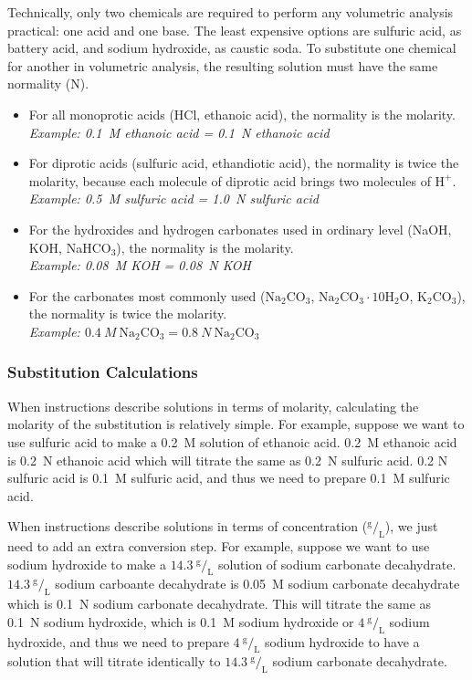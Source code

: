 Technically, only two chemicals are required to perform any volumetric analysis practical: one acid and one base. The least expensive options are sulfuric acid, as battery acid, and sodium hydroxide, as caustic soda. To substitute one chemical for another in volumetric analysis, the resulting solution must have the same normality (N).

\begin{itemize}

\item{For all monoprotic acids (HCl, ethanoic acid), the normality is the molarity.\\
\textit{Example: 0.1~M ethanoic acid = 0.1~N ethanoic acid}}
\item{For diprotic acids (sulfuric acid, ethandiotic acid), the normality is twice the molarity, because each molecule of diprotic acid brings two molecules of $\mathrm{H}^{+}$.\\
\textit{Example: 0.5~M sulfuric acid = 1.0~N sulfuric acid}}
\item{For the hydroxides and hydrogen carbonates used in ordinary level (NaOH, KOH, NaHCO$_{3}$), the normality is the molarity.\\
\textit{Example: 0.08~M KOH = 0.08~N KOH}}
\item{For the carbonates most commonly used ($\mathrm{Na}_2\mathrm{CO}_3$, $\mathrm{Na}_2\mathrm{CO}_3 \cdot 10\mathrm{H}_2\mathrm{O}$, $\mathrm{K}_2\mathrm{CO}_3$), the normality is twice the molarity.\\
\textit{Example: $0.4~M~ \mathrm{Na}_2\mathrm{CO}_3 = 0.8~N~ \mathrm{Na}_2\mathrm{CO}_3$}}

\end{itemize}

\subsubsection{Substitution Calculations}

When instructions describe solutions in terms of molarity, calculating the molarity of the substitution is relatively simple. For example, suppose we want to use sulfuric acid to make a 0.2~M solution of ethanoic acid. 0.2~M ethanoic acid is 0.2~N ethanoic acid which will titrate the same as 0.2~N sulfuric acid. 0.2 N sulfuric acid is 0.1~M sulfuric acid, and thus we need to prepare 0.1~M sulfuric acid.

When instructions describe solutions in terms of concentration ($^\text{g}/_\text{L}$), we just need to add an extra conversion step. For example, suppose we want to use sodium hydroxide to make a $14.3~^\text{g}/_\text{L}$ solution of sodium carbonate decahydrate. $14.3~^\text{g}/_\text{L}$ sodium carboante decahydrate is 0.05~M sodium carbonate decahydrate which is 0.1~N sodium carbonate decahydrate. This will titrate the same as 0.1~N sodium hydroxide, which is 0.1~M sodium hydroxide or $4~^\text{g}/_\text{L}$ sodium hydroxide, and thus we need to prepare $4~^\text{g}/_\text{L}$ sodium hydroxide to have a solution that will titrate identically to $14.3~^\text{g}/_\text{L}$ sodium carbonate decahydrate.


